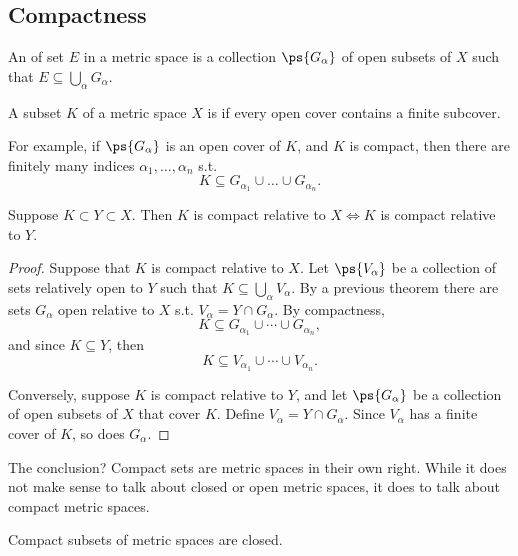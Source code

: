\documentclass[11pt]{scrartcl}
\numberwithin{equation}{section}
\begin{document}
\subsection{Compactness}
\begin{definition}
    An  of set $E$ in a metric space is a collection
    $\ps{G_\alpha}$ of open subsets of $X$ such that $E\subseteq \bigcup_\alpha G_\alpha$.
\end{definition}

\begin{definition}
    A subset $K$ of a metric space $X$ is  if every open cover contains a finite subcover.
\end{definition}

For example, 
if $\ps{G_\alpha}$ is an open cover of $K$, and 
$K$ is compact, then there are finitely 
many indices $\alpha_1,\dots,\alpha_n$ s.t. 
\[ K\subseteq G_{\alpha_1}\cup\dots\cup G_{\alpha_n}. \]

\begin{theorem}
    Suppose $K\subset Y\subset X$. Then $K$ is compact relative to $X
    \iff K$ is compact relative to $Y$.
\end{theorem}

\begin{proof}
    Suppose that $K$ is compact relative to $X$. Let $\ps{V_\alpha}$ 
    be a collection of sets relatively open to $Y$ such 
    that $K \subseteq \bigcup_{\alpha}V_\alpha$. By a previous theorem
    there are sets $G_\alpha$ open relative to $X$ s.t. $V_\alpha=Y\cap G_\alpha$. By compactness,
    \[ K \subseteq G_{\alpha_1}\cup\cdots\cup G_{\alpha_n},\]
    and since $K\subseteq Y$, then 
    \[ K \subseteq V_{\alpha_1}\cup\cdots\cup V_{\alpha_n}. \]

    Conversely, suppose $K$ is compact relative to $Y$,
    and let $\ps{G_\alpha}$ be a collection of open subsets of $X$
    that cover $K$. Define $V_\alpha=Y\cap G_\alpha$.
    Since $V_\alpha$ has a finite cover of $K$, so does $G_\alpha$.
\end{proof}

The conclusion? Compact sets are metric spaces
in their own right. While it does not make sense to talk about 
closed or open metric spaces, 
it does to talk about compact metric spaces.


\begin{theorem}
    Compact subsets of metric spaces are closed.
\end{theorem}
\end{document}
